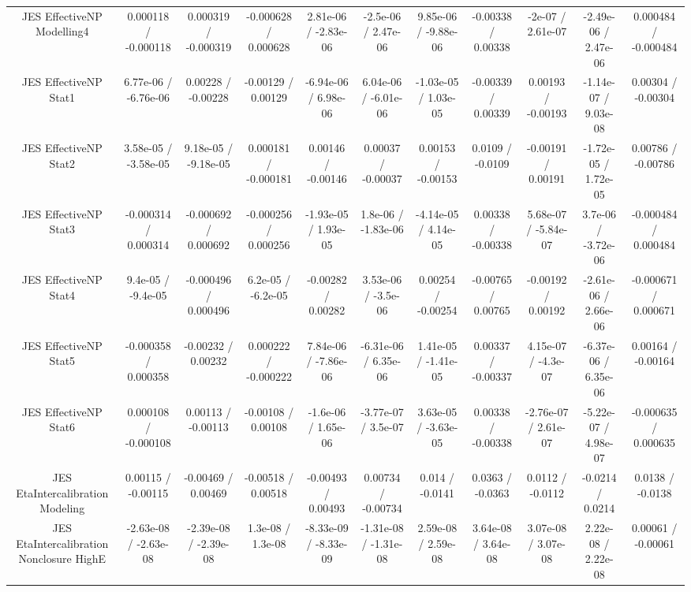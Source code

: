 \begin{table}[htbp]
\begin{center}
\begin{tabular}{|c|c|c|c|c|c|c|c|c|c|c|}
  JES EffectiveNP Modelling4 & 0.000118 / -0.000118 & 0.000319 / -0.000319 & -0.000628 / 0.000628 & 2.81e-06 / -2.83e-06 & -2.5e-06 / 2.47e-06 & 9.85e-06 / -9.88e-06 & -0.00338 / 0.00338 & -2e-07 / 2.61e-07 & -2.49e-06 / 2.47e-06 & 0.000484 / -0.000484 \\ 
  JES EffectiveNP Stat1 & 6.77e-06 / -6.76e-06 & 0.00228 / -0.00228 & -0.00129 / 0.00129 & -6.94e-06 / 6.98e-06 & 6.04e-06 / -6.01e-06 & -1.03e-05 / 1.03e-05 & -0.00339 / 0.00339 & 0.00193 / -0.00193 & -1.14e-07 / 9.03e-08 & 0.00304 / -0.00304 \\ 
  JES EffectiveNP Stat2 & 3.58e-05 / -3.58e-05 & 9.18e-05 / -9.18e-05 & 0.000181 / -0.000181 & 0.00146 / -0.00146 & 0.00037 / -0.00037 & 0.00153 / -0.00153 & 0.0109 / -0.0109 & -0.00191 / 0.00191 & -1.72e-05 / 1.72e-05 & 0.00786 / -0.00786 \\ 
  JES EffectiveNP Stat3 & -0.000314 / 0.000314 & -0.000692 / 0.000692 & -0.000256 / 0.000256 & -1.93e-05 / 1.93e-05 & 1.8e-06 / -1.83e-06 & -4.14e-05 / 4.14e-05 & 0.00338 / -0.00338 & 5.68e-07 / -5.84e-07 & 3.7e-06 / -3.72e-06 & -0.000484 / 0.000484 \\ 
  JES EffectiveNP Stat4 & 9.4e-05 / -9.4e-05 & -0.000496 / 0.000496 & 6.2e-05 / -6.2e-05 & -0.00282 / 0.00282 & 3.53e-06 / -3.5e-06 & 0.00254 / -0.00254 & -0.00765 / 0.00765 & -0.00192 / 0.00192 & -2.61e-06 / 2.66e-06 & -0.000671 / 0.000671 \\ 
  JES EffectiveNP Stat5 & -0.000358 / 0.000358 & -0.00232 / 0.00232 & 0.000222 / -0.000222 & 7.84e-06 / -7.86e-06 & -6.31e-06 / 6.35e-06 & 1.41e-05 / -1.41e-05 & 0.00337 / -0.00337 & 4.15e-07 / -4.3e-07 & -6.37e-06 / 6.35e-06 & 0.00164 / -0.00164 \\ 
  JES EffectiveNP Stat6 & 0.000108 / -0.000108 & 0.00113 / -0.00113 & -0.00108 / 0.00108 & -1.6e-06 / 1.65e-06 & -3.77e-07 / 3.5e-07 & 3.63e-05 / -3.63e-05 & 0.00338 / -0.00338 & -2.76e-07 / 2.61e-07 & -5.22e-07 / 4.98e-07 & -0.000635 / 0.000635 \\ 
  JES EtaIntercalibration Modeling & 0.00115 / -0.00115 & -0.00469 / 0.00469 & -0.00518 / 0.00518 & -0.00493 / 0.00493 & 0.00734 / -0.00734 & 0.014 / -0.0141 & 0.0363 / -0.0363 & 0.0112 / -0.0112 & -0.0214 / 0.0214 & 0.0138 / -0.0138 \\ 
  JES EtaIntercalibration Nonclosure HighE & -2.63e-08 / -2.63e-08 & -2.39e-08 / -2.39e-08 & 1.3e-08 / 1.3e-08 & -8.33e-09 / -8.33e-09 & -1.31e-08 / -1.31e-08 & 2.59e-08 / 2.59e-08 & 3.64e-08 / 3.64e-08 & 3.07e-08 / 3.07e-08 & 2.22e-08 / 2.22e-08 & 0.00061 / -0.00061 \\ 

\end{tabular}
\end{center}
\end{table}
